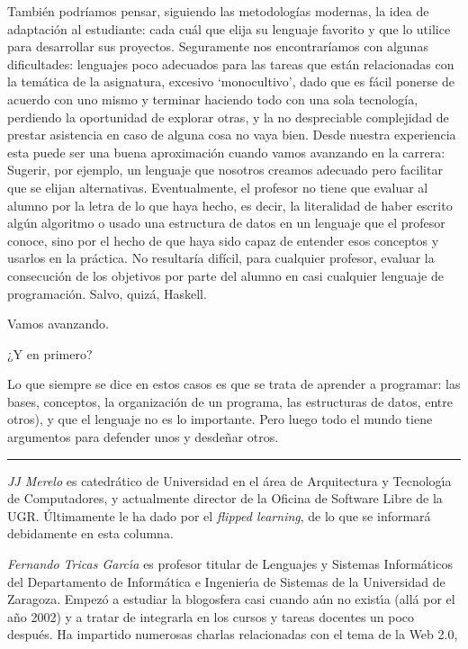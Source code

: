 \documentclass[twoside,10pt]{article}
\newcounter{num}
\begin{document}
\begin{multicols}{2}
También podríamos pensar, siguiendo las metodologías modernas, la idea de
adaptación al estudiante: cada cuál que elija su lenguaje favorito y que lo
utilice
para desarrollar sus proyectos. Seguramente nos encontraríamos con algunas
dificultades: lenguajes poco adecuados para las tareas que están
relacionadas con la temática de la asignatura, excesivo `monocultivo',
dado que es fácil ponerse de acuerdo con uno mismo y terminar haciendo todo
con una sola tecnología, perdiendo la oportunidad de explorar otras, y la
no despreciable complejidad de prestar asistencia en caso de alguna cosa no
vaya bien. Desde nuestra experiencia esta puede ser una buena aproximación
cuando vamos avanzando en la carrera: Sugerir, por ejemplo, un lenguaje que
nosotros creamos adecuado pero facilitar que se elijan alternativas.
Eventualmente, el profesor no tiene que evaluar al
alumno por la letra de lo que haya hecho, es decir, la literalidad de
haber escrito algún algoritmo o usado una estructura de datos en un
lenguaje que el profesor conoce, sino por el hecho de que haya sido
capaz de entender esos conceptos y usarlos en la práctica. No
resultaría difícil, para cualquier profesor, evaluar la consecución de
los objetivos por parte del alumno en casi cualquier lenguaje de
programación. Salvo, quizá, Haskell. 

Vamos avanzando.

¿Y en primero? 

Lo que siempre se dice en estos casos es que se trata de aprender a
programar: las bases, conceptos, la organización de un programa, las
estructuras de datos, entre
otros), y que el lenguaje no es lo
importante. Pero luego todo el mundo tiene argumentos para defender unos
y desdeñar otros.
\noindent\rule{86mm}{1pt}
\vspace{1ex} {\small{\begin{window} 
\noindent\emph{JJ Merelo} es catedr\'{a}tico de Universidad
en el \'area de Arquitectura y Tecnolog\'{\i}a de Computadores, y
actualmente director de la Oficina de Software Libre de la UGR.
\'{U}ltimamente le ha dado por el \textsl{flipped
learning}, de lo que se informar\'{a} debidamente en esta columna.
\end{window}}}

\medskip

{\small{\begin{window}
		\noindent \emph{Fernando Tricas Garc\'{\i}a} es profesor
		titular de Lenguajes y Sistemas Inform\'{a}ticos del Departamento
		de Inform\'{a}tica e Ingenier\'{\i}a de Sistemas de la Universidad de
		Zaragoza.  Empez\'{o} a estudiar la blogosfera casi cuando a\'{u}n no
		exist\'{\i}a (all\'{a} por el a\~{n}o 2002) y a tratar de integrarla en los
		cursos y tareas docentes un poco despu\'{e}s.  Ha impartido
		numerosas charlas relacionadas con el tema de la Web 2.0, 


\end{window}}}
\end{multicols}
\end{document}
